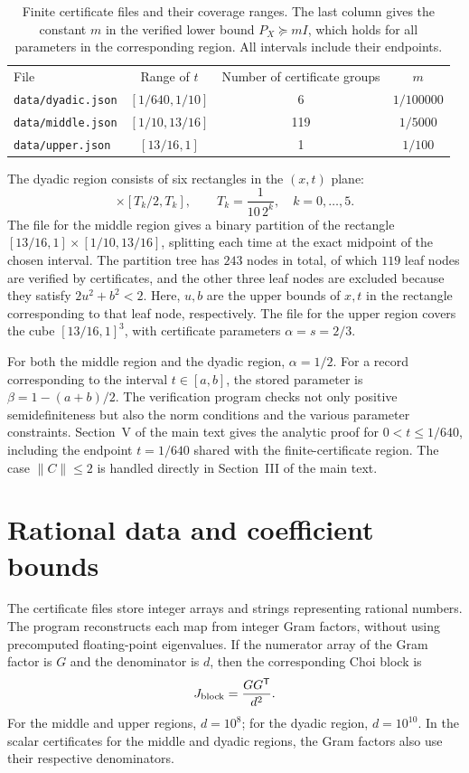 \documentclass[aps,pra,onecolumn,notitlepage,10pt,amsmath,amssymb,nofootinbib]{revtex4-1}
\newcommand{\norm}[1]{\lVert#1\rVert}
\begin{document}
\begin{table}[h]
\caption{Finite certificate files and their coverage ranges. The last column gives the constant \(m\) in the verified lower bound \(P_X\succeq mI\), which holds for all parameters in the corresponding region. All intervals include their endpoints.}
\label{tab:domains}
\begin{ruledtabular}
\begin{tabular}{lccc}
File & Range of \(t\) & Number of certificate groups & \(m\)\\
\texttt{data/dyadic.json} & $[1/640,1/10]$ & 6 & $1/100000$\\
\texttt{data/middle.json} & $[1/10,13/16]$ & 119 & $1/5000$\\
\texttt{data/upper.json} & $[13/16,1]$ & 1 & $1/100$
\end{tabular}
\end{ruledtabular}
\end{table}

The dyadic region consists of six rectangles in the \((x,t)\) plane:
\begin{equation}
 [1-T_k^2/2,1]\times[T_k/2,T_k],\qquad
 T_k=\frac{1}{10\,2^k},\quad k=0,\ldots,5.
\end{equation}
The file for the middle region gives a binary partition of the rectangle
\([13/16,1]\times[1/10,13/16]\), splitting each time at the exact midpoint of the chosen interval.
The partition tree has \(243\) nodes in total, of which \(119\) leaf nodes are verified by certificates, and the other three leaf nodes are excluded because they satisfy \(2u^2+b^2<2\). Here, \(u,b\) are the upper bounds of \(x,t\) in the rectangle corresponding to that leaf node, respectively.
The file for the upper region covers the cube \([13/16,1]^3\), with certificate parameters \(\alpha=s=2/3\).

For both the middle region and the dyadic region, \(\alpha=1/2\).
For a record corresponding to the interval \(t\in[a,b]\), the stored parameter is \(\beta=1-(a+b)/2\).
The verification program checks not only positive semidefiniteness but also the norm conditions and the various parameter constraints.
Section~V of the main text gives the analytic proof for \(0<t\le1/640\), including the endpoint \(t=1/640\) shared with the finite-certificate region.
The case \(\norm C\le2\) is handled directly in Section~III of the main text.

\section{Rational data and coefficient bounds}
The certificate files store integer arrays and strings representing rational numbers. The program reconstructs each map from integer Gram factors, without using precomputed floating-point eigenvalues. If the numerator array of the Gram factor is \(G\) and the denominator is \(d\), then the corresponding Choi block is
\begin{equation}
 J_{\rm block}=\frac{GG^{\mathsf T}}{d^2}.
\end{equation}
For the middle and upper regions, \(d=10^8\); for the dyadic region, \(d=10^{10}\). In the scalar certificates for the middle and dyadic regions, the Gram factors also use their respective denominators.
\end{document}
